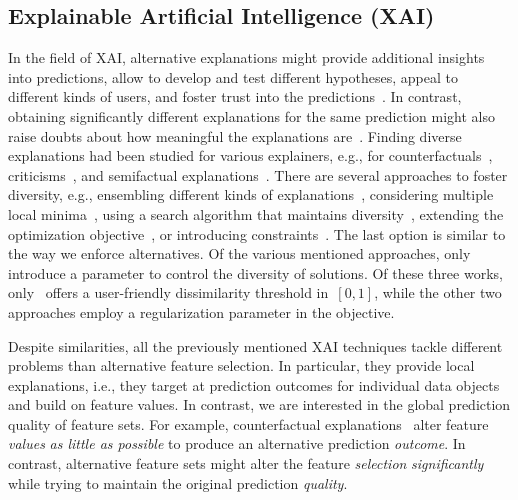 \documentclass{article}
\theoremstyle{definition}
\begin{document}
\subsection{Explainable Artificial Intelligence (XAI)}
\label{sec:afs:related-work:xai}

In the field of XAI, alternative explanations might provide additional insights into predictions, allow to develop and test different hypotheses, appeal to different kinds of users, and foster trust into the predictions~\cite{kim2021multi, wang2019designing}.
In contrast, obtaining significantly different explanations for the same prediction might also raise doubts about how meaningful the explanations are~\cite{jain2019attention}.
Finding diverse explanations had been studied for various explainers, e.g., for counterfactuals~\cite{dandl2020multi, karimi2020model, mohammadi2021scaling, mothilal2020explaining, russell2019efficient, wachter2017counterfactual}, criticisms~\cite{kim2016examples}, and semifactual explanations~\cite{artelt2022even}.
There are several approaches to foster diversity, e.g., ensembling different kinds of explanations~\cite{silva2019produce}, considering multiple local minima~\cite{wachter2017counterfactual}, using a search algorithm that maintains diversity~\cite{dandl2020multi}, extending the optimization objective~\cite{artelt2022even, kim2016examples, mothilal2020explaining}, or introducing constraints~\cite{karimi2020model, mohammadi2021scaling, russell2019efficient}.
The last option is similar to the way we enforce alternatives.
Of the various mentioned approaches, only~\cite{artelt2022even, mohammadi2021scaling, mothilal2020explaining} introduce a parameter to control the diversity of solutions.
Of these three works, only~\cite{mohammadi2021scaling} offers a user-friendly dissimilarity threshold in~$[0,1]$, while the other two approaches employ a regularization parameter in the objective.

Despite similarities, all the previously mentioned XAI techniques tackle different problems than alternative feature selection.
In particular, they provide local explanations, i.e., they target at prediction outcomes for individual data objects and build on feature values.
In contrast, we are interested in the global prediction quality of feature sets.
For example, counterfactual explanations~\cite{guidotti2022counterfactual, stepin2021survey, verma2020counterfactual} alter feature \emph{values} \emph{as little as possible} to produce an alternative prediction \emph{outcome}.
In contrast, alternative feature sets might alter the feature \emph{selection} \emph{significantly} while trying to maintain the original prediction \emph{quality}.
\end{document}
